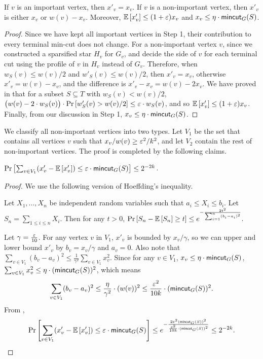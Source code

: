 \begin{observation}
If $v$ is an important vertex, then $x'_v=x_v$. If $v$ is a non-important vertex, then $x'_v$ is either $x_v$ or $w(v)-x_v$. Moreover, ${\mathbb{E}}\left[ x'_v \right] \le (1+{\varepsilon})x_v$ and $x_v \le \eta \cdot \mathsf{mincut}_G(S)$.
\end{observation}
\begin{proof}
Since we have kept all important vertices in Step 1, their contribution to every terminal min-cut does not change.
For a non-important vertex $v$, since we constructed a sparsified star $H_v$ for $G_v$, and decide the side of $v$ for each terminal cut using the profile of $v$ in $H_v$ instead of $G_v$. 
Therefore, when $w_S(v)\le w(v)/2$ and $w'_S(v)\le w(v)/2$, then $x'_v=x_v$, otherwise $x'_v=w(v)-x_v$, and the difference is $x'_v-x_v=w(v)-2x_v$.
We have proved in  that for a subset $S\subseteq T$ with $w_S(v)<w(v)/2$, $\big(w(v)-2\cdot w_S(v)\big) \cdot \mathrm{Pr}\left[ w'_S(v)>w(v)/2 \right] \le {\varepsilon} \cdot w_S(v)$, and so ${\mathbb{E}}\left[ x'_v \right] \le (1+{\varepsilon})x_v$. Finally, from our discussion in Step 1, $x_v \le \eta \cdot \mathsf{mincut}_G(S)$. 
\end{proof}

We classify all non-important vertices into two types. 
Let $V_1$ be the set that contains all vertices $v$ such that $x_v/w(v) \ge {\varepsilon}^2/k^2$, and let $V_2$ contain the rest of non-important vertices. 
The proof is completed by the following claims.

\begin{claim}
$\mathrm{Pr}\left[ \sum_{v \in V_1} (x'_v - {\mathbb{E}}\left[ x'_v \right]) \le {\varepsilon}\cdot \mathsf{mincut}_G(S) \right] \le 2^{-2k}$.
\end{claim}
\begin{proof}
We use the following version of Hoeffding's inequality.
\begin{lemma} \label{hoeffding}
	Let $X_1,\dots,X_n$ be independent random variables such that $a_i \le X_i \le b_i$. Let $S_n = \sum_{1\le  i\le n}X_i$. Then for any $t>0$,
	$\mathrm{Pr}\left[ S_n - {\mathbb{E}}\left[ S_n \right] \ge t \right] \le e^{-\frac{2t^2}{\sum_{i=1}^n(b_i-a_i)^2}}.
	$
\end{lemma}

Let $\gamma = \frac{{\varepsilon}}{10}$.
For any vertex $v$ in $V_1$, $x'_v$ is bounded by $x_v/\gamma$, so we can upper and lower bound $x'_v$ by $b_v = x_v/\gamma$ and $a_v=0$. Also note that 
$\sum_{v\in V_1} (b_v-a_v)^2 \le \frac{1}{\gamma^2} \sum_{v\in V_1} x^2_v.$
Since for any $v \in V_1$, $x_v \le \eta \cdot \mathsf{mincut}_G(S)$, $\sum_{v\in V_1} x^2_v \le \eta \cdot(\mathsf{mincut}_G(S))^2$, which means 
$$
\sum_{v\in V_1} (b_v-a_v)^2 \le \frac{\eta}{\gamma^2} \cdot (w(v))^2 \le \frac{{\varepsilon}^2}{10k}\cdot (\mathsf{mincut}_G(S))^2.
$$
From , 
$$
\mathrm{Pr}\left[ \sum_{v \in V_1} (x'_v - {\mathbb{E}}\left[ x'_v \right]) \le {\varepsilon}\cdot \mathsf{mincut}_G(S) \right] \le e^{-\frac{2{\varepsilon}^2 (\mathsf{mincut}_G(S))^2}{\frac{{\varepsilon}^2}{10k}\cdot(\mathsf{mincut}_G(S))^2}} \le 2^{-2k}.
$$
\end{proof}


